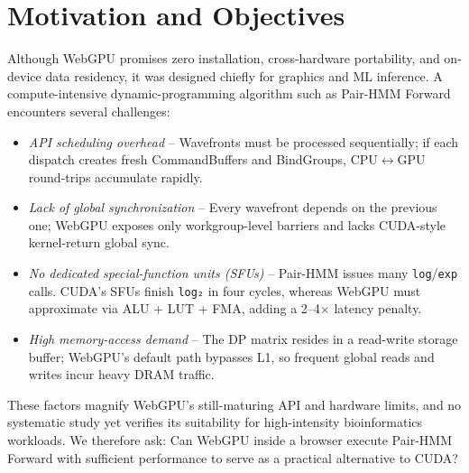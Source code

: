 \documentclass[PhD]{PHlab-thesis}
\begin{document}
\section{Motivation and Objectives}
Although WebGPU promises zero installation, cross-hardware portability, and on-device data residency, it was designed chiefly for graphics and ML inference. A compute-intensive dynamic-programming algorithm such as Pair-HMM Forward encounters several challenges:
\begin{itemize}
    \item \emph{API scheduling overhead} – Wavefronts must be processed sequentially; if each dispatch creates fresh CommandBuffers and BindGroups, CPU$\leftrightarrow$GPU round-trips accumulate rapidly.
    \item \emph{Lack of global synchronization} – Every wavefront depends on the previous one; WebGPU exposes only workgroup-level barriers and lacks CUDA-style kernel-return global sync.
    \item \emph{No dedicated special-function units (SFUs)} – Pair-HMM issues many \texttt{log}/\texttt{exp} calls. CUDA’s SFUs finish \texttt{log₂} in four cycles, whereas WebGPU must approximate via ALU + LUT + FMA, adding a 2–4$\times$ latency penalty.
    \item \emph{High memory-access demand} – The DP matrix resides in a read-write storage buffer; WebGPU’s default path bypasses L1, so frequent global reads and writes incur heavy DRAM traffic.
\end{itemize}
These factors magnify WebGPU’s still-maturing API and hardware limits, and no systematic study yet verifies its suitability for high-intensity bioinformatics workloads. We therefore ask: Can WebGPU inside a browser execute Pair-HMM Forward with sufficient performance to serve as a practical alternative to CUDA?
\end{document}
